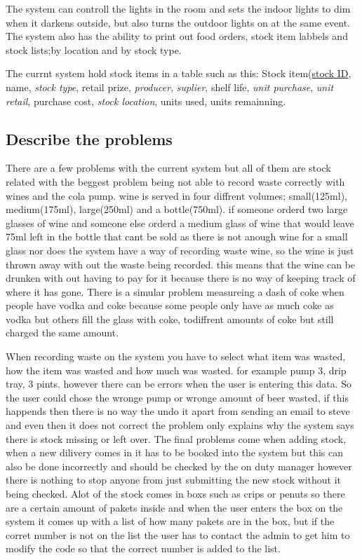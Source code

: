 The system can controll the lights in the room and sets the indoor lights to dim when it darkens outside, but also turns the outdoor lights on at the same event. The system also has the ability to print out food orders, stock item labbels and stock lists;by location and by stock type.

The currnt system hold stock items in a table such as this: Stock item(\underline{stock ID}, name, \emph{stock type}, retail prize, \emph{producer}, \emph{suplier}, shelf life, \emph{unit purchase}, \emph{unit retail}, purchase cost, \emph{stock location}, units used, units remainning.



\subsection{Describe the problems}

There are a few problems with the current system but all of them are stock related with the beggest problem being not able to record waste correctly with wines and the cola pump. wine is served in four diffrent volumes; small(125ml), medium(175ml), large(250ml) and a bottle(750ml). if someone orderd two large glasses of wine and someone else orderd a medium glass of wine that would leave 75ml left in the bottle that cant be sold as there is not anough wine for a small glass nor does the system have a way of recording waste wine, so the wine is just thrown away with out the waste being recorded. this means that the wine can be drunken with out having to pay for it because there is no way of keeping track of where it has gone. There is a simular problem measureing a dash of coke when people have vodka and coke because some people only have as much coke as vodka but others fill the glass with coke, todiffrent amounts of coke but still charged the same amount.

When recording waste on the system you have to select what item was wasted, how the item was wasted and how much was wasted. for example pump 3, drip tray, 3 pints. however there can be errors when the user is entering this data. So the user could chose the wronge pump or wronge amount of beer wasted, if this happends then there is no way the undo it apart from sending an email to steve and even then it does not correct the problem only explains why the system says there is stock missing or left over. The final problems come when adding stock, when a new dilivery comes in it has to be booked into the system but this can also be done incorrectly and should be checked by the on duty manager however there is nothing to stop anyone from just submitting the new stock without it being checked. Alot of the stock comes in boxs such as crips or penuts so there are a certain amount of pakets inside and when the user enters the box on the system it comes up with a list of how many pakets are in the box, but if the corret number is not on the list the user has to contact the admin to get him to modify the code so that the correct number is added to the list.

